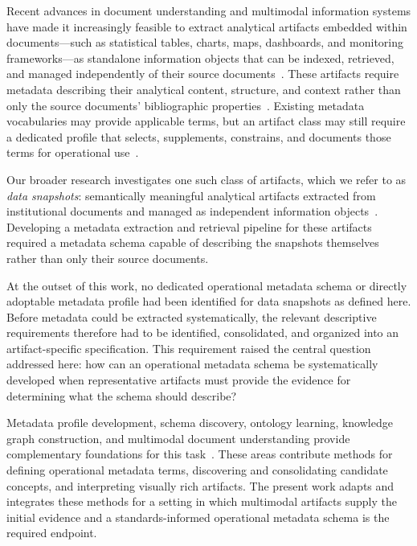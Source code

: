 \documentclass{article}
\begin{document}
Recent advances in document understanding and multimodal information systems have made it increasingly feasible to extract analytical artifacts embedded within documents---such as statistical tables, charts, maps, dashboards, and monitoring frameworks---as standalone information objects that can be indexed, retrieved, and managed independently of their source documents~\citep{wang2025,dy2026}. These artifacts require metadata describing their analytical content, structure, and context rather than only the source documents' bibliographic properties~\citep{gilliland2008}. Existing metadata vocabularies may provide applicable terms, but an artifact class may still require a dedicated profile that selects, supplements, constrains, and documents those terms for operational use~\citep{greenberg2005,coyle2009applicationprofiles}.

Our broader research investigates one such class of artifacts, which we refer to as \emph{data snapshots}: semantically meaningful analytical artifacts extracted from institutional documents and managed as independent information objects~\citep{dy2026}. Developing a metadata extraction and retrieval pipeline for these artifacts required a metadata schema capable of describing the snapshots themselves rather than only their source documents.

At the outset of this work, no dedicated operational metadata schema or directly adoptable metadata profile had been identified for data snapshots as defined here. Before metadata could be extracted systematically, the relevant descriptive requirements therefore had to be identified, consolidated, and organized into an artifact-specific specification. This requirement raised the central question addressed here: how can an operational metadata schema be systematically developed when representative artifacts must provide the evidence for determining what the schema should describe?

Metadata profile development, schema discovery, ontology learning, knowledge graph construction, and multimodal document understanding provide complementary foundations for this task~\citep{coyle2009applicationprofiles,sadruddin2025schemadiscovery,giglou2023llms4ol,zhang2024edc,ding2026vrdu}. These areas contribute methods for defining operational metadata terms, discovering and consolidating candidate concepts, and interpreting visually rich artifacts. The present work adapts and integrates these methods for a setting in which multimodal artifacts supply the initial evidence and a standards-informed operational metadata schema is the required endpoint.
\end{document}
